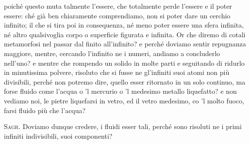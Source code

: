 \documentclass[11pt,twoside,openany]{book}
\newcommand{\speaker}[1]{\textcolor{rubric}{\textsc{#1}}\space}
\begin{document}
poiché questo muta talmente l'essere, che totalmente perde l'essere e il poter essere: ché già ben chiaramente comprendiamo, non si poter dare un cerchio infinito; il che si tira poi in consequenza, né meno poter essere una sfera infinita, né altro qualsivoglia corpo o superficie figurata e infinita. Or che diremo di cotali metamorfosi nel passar dal finito all'infinito? e perché doviamo sentir repugnanza maggiore, mentre, cercando l'infinito ne i numeri, andiamo a concluderlo nell'uno? e mentre che rompendo un solido in molte parti e seguitando di ridurlo in minutissima polvere, risoluto che si fusse ne gl'infiniti suoi atomi non più divisibili, perché non potremo dire, quello esser ritornato in un solo continuo, ma forse fluido come l'acqua o 'l mercurio o 'l medesimo metallo liquefatto? e non vediamo noi, le pietre liquefarsi in vetro, ed il vetro medesimo, co 'l molto fuoco, farsi fluido più che l'acqua?

\speaker{Sagr.} Doviamo dunque credere, i fluidi esser tali, perché sono risoluti ne i primi infiniti indivisibili, suoi componenti?
\end{document}

